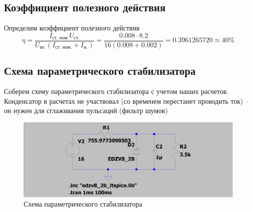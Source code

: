 \documentclass[a4paper, 12pt]{article}
\begin{document}
    \subsection{Коэффициент полезного действия}
    Определим коэффициент полезного действия
    $$
    \eta=\dfrac{I_\text{ст. ном.}U_{\text{ст.}}}{U_{\text{вх.}}\left( I_{\text{ст. ном.}}+I_{\text{н.}} \right)}=\dfrac{0.008\cdot8.2}{16\left( 0.008+0.002 \right)}=0.3961265720\approx40\%
    $$


    \subsection{Схема параметрического стабилизатора}
    Соберем схему параметрического стабилизатора с учетом наших расчетов.
    Конденсатор в расчетах не участвовал (со временем перестанет проводить ток)
    -- он нужен для сглаживания пульсаций (фильтр шумов)
    \begin{figure}[H]
        \centering
        \includegraphics[scale=0.22]{scheme1.png}
        \captionsetup{skip=0pt}
        \caption{Схема параметрического стабилизатора}
        \label{fig:scheme1}
    \end{figure}
\end{document}
